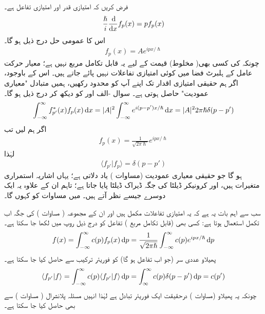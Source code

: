 \quad
فرض کریں کہ  امتیازی قدر اور  امتیازی تفاعل ہے۔
\begin{align}
\frac{\hslash}{i} \frac{\dif}{\dif x} f_{p}(x) = pf_{p}(x)
\end{align}
اس کا عمومی حل درج ذیل ہو گا۔
\begin{align*}
f_{p}(x) = Ae^{ipx/\hslash}
\end{align*}
چونکہ  کی کسی بھی( مخلوط)  قیمت کے لیے یہ قابل تکامل مربع نہیں ہے؛   معیار حرکت عامل کے ہلبرٹ فضا میں کوئی امتیازی تفاعلات نہیں  پائے جاتے ہیں۔  اس کے باوجود،  اگر ہم حقیقی امتیازی اقدار تک اپنے آپ کو محدود رکھیں،  ہمیں متبادل "معیاری عمودیت" حاصل ہوتی ہے۔   سوال  -الف  اور   کو دیکھ کر درج ذیل ہو گا۔
\begin{align}
\int_{-\infty}^{\infty} f_{p'}^{*}(x)f_{p}(x) \dif x = |A|^{2}\int_{-\infty}^{\infty}e^{i(p-p')x/\hslash} \dif x = |A|^{2}2\pi\hslash\delta(p-p')
\end{align}
اگر ہم  لیں تب 
\begin{align}\label{مساوات_قواعد_امتیازی_تفاعل_معیار_حرکت}
f_{p}(x) = \frac{1}{\sqrt{2\pi\hslash}}e^{ipx/\hslash}
\end{align}
  لہٰذا 
\begin{align}\label{مساوات_قواعد_ڈیراک_معیاری_عمودیت}
\langle f_{p'} | f_{p} \rangle = \delta(p-p')
\end{align}
ہو گا جو حقیقی معیاری عمودیت (مساوات  )   یاد دلاتی  ہے؛   یہاں اشاریہ استمراری متغیرات ہیں،  اور کرونیکر ڈیلٹا کی جگہ ڈیراک ڈیلٹا پایا جاتا ہے؛   تاہم  ان  کے علاوہ یہ ایک دوسرے جیسے نظر آتے ہیں۔  میں مساوات  کو  کہوں گا۔  

سب سے اہم بات یہ ہے کہ یہ امتیازی تفاعلات مکمل ہیں اور ان کے مجموعہ ( مساوات ) کی جگہ اب تکمل استعمال ہوتا ہے:  کسی بھی (قابل تکامل مربع ) تفاعل  کو درج ذیل روپ میں لکھا جا سکتا ہے۔
\begin{align}\label{مساوات_قواعد_تفاعل_بطور_فوریئر_تکمل}
f(x) = \int_{-\infty}^{\infty} c(p)f_{p}(x)\dif p = \frac{1}{\sqrt{2\pi\hslash}}\int_{-\infty}^{\infty}c(p)e^{ipx/\hslash}\dif p
\end{align}
پھیلاو  عددی سر (جو اب  تفاعل   ہو گا)  کو فوریئر  ترکیب سے حاصل کیا جا سکتا ہے۔
\begin{align}
\langle f_{p'} | f \rangle = \int_{-\infty}^{\infty} c(p) \langle f_{p'} | f \rangle \dif p = \int_{\infty}^{\infty}c(p)\delta (p-p') \dif p = c(p')
\end{align}
چونکہ یہ پھیلاو (مساوات )   درحقیقت ایک  فوریئر تبادل ہے لہٰذا   انہیں مسئلہ پلانشرال ( مساوات )  سے بھی حاصل کیا جا سکتا ہے۔ 

